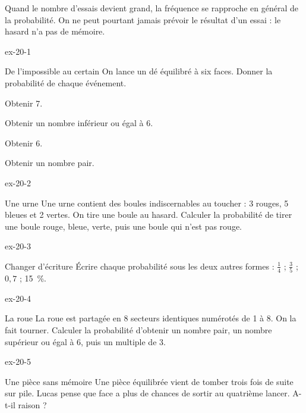 \begin{propriete}Quand le nombre d’essais devient grand, la fréquence se rapproche en général de la probabilité. On ne peut pourtant jamais prévoir le résultat d’un essai : le hasard n’a pas de mémoire.\end{propriete}

\clearpage{}
\begin{blocLivre}{ex-20-1}\begin{exercice}[1]{De l’impossible au certain}
On lance un dé équilibré à six faces. Donner la probabilité de chaque événement.\begin{questions}
\item Obtenir 7.
\item Obtenir un nombre inférieur ou égal à 6.
\item Obtenir 6.
\item Obtenir un nombre pair.
\end{questions}
\end{exercice}\end{blocLivre}
\begin{blocLivre}{ex-20-2}\begin{exercice}[1]{Une urne}
Une urne contient des boules indiscernables au toucher : 3 rouges, 5 bleues et 2 vertes. On tire une boule au hasard. Calculer la probabilité de tirer une boule rouge, bleue, verte, puis une boule qui n’est pas rouge.
\label{fig-ex-20-2}
\end{exercice}\end{blocLivre}
\begin{blocLivre}{ex-20-3}\begin{exercice}[1]{Changer d’écriture}
Écrire chaque probabilité sous les deux autres formes : $\frac14$ ; $\frac35$ ; $0{,}7$ ; 15~\%.
\end{exercice}\end{blocLivre}
\begin{blocLivre}{ex-20-4}\begin{exercice}[1]{La roue}
La roue est partagée en 8 secteurs identiques numérotés de 1 à 8. On la fait tourner. Calculer la probabilité d’obtenir un nombre pair, un nombre supérieur ou égal à 6, puis un multiple de 3.
\label{fig-ex-20-4}
\end{exercice}\end{blocLivre}
\begin{blocLivre}{ex-20-5}\begin{exercice}[1]{Une pièce sans mémoire}
Une pièce équilibrée vient de tomber trois fois de suite sur pile. Lucas pense que face a plus de chances de sortir au quatrième lancer. A-t-il raison ?
\end{exercice}\end{blocLivre}

